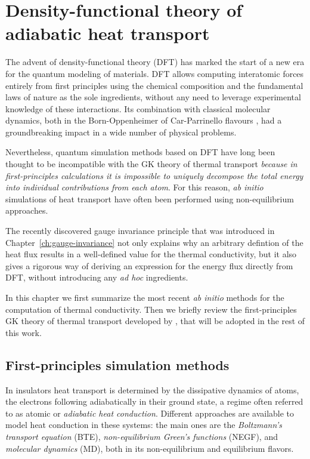 \chapter{Density-functional theory of adiabatic heat transport} \label{ch:dft-heat}

\begin{LEtext}
The advent of density-functional theory (DFT) \cite{Hohenberg1964,Kohn1965} has marked the start of a new era for the quantum modeling of materials. DFT allows computing interatomic forces entirely from first principles using the chemical composition and the fundamental laws of nature as the sole ingredients, without any need to leverage experimental knowledge of these interactions.
Its combination with classical molecular dynamics, both in the Born-Oppenheimer of Car-Parrinello flavours \cite{Car1985,Marx2009}, had a groundbreaking impact in a wide number of physical problems.

Nevertheless, quantum simulation methods based on DFT have long been thought to be incompatible with the GK theory of thermal transport \emph{because in first-principles calculations it is impossible to uniquely decompose the total energy into individual contributions from each atom}. \citep{Stackhouse2010b} For this reason, \emph{ab initio} simulations of heat transport have often been performed using non-equilibrium approaches.

The recently discovered gauge invariance principle that was introduced in Chapter~\ref{ch:gauge-invariance} not only explains why an arbitrary defintion of the heat flux results in a well-defined value for the thermal conductivity, but it also gives a rigorous way of deriving an expression for the energy flux directly from DFT, without introducing any \emph{ad hoc} ingredients.

In this chapter we first summarize the most recent \emph{ab initio} methods for the computation of thermal conductivity. Then we briefly review the first-principles GK theory of thermal transport developed by \citet{Marcolongo2014}, that will be adopted in the rest of this work.
\end{LEtext}


\section{First-principles simulation methods}

In insulators heat transport is determined by the dissipative dynamics of atoms, the electrons following adiabatically in their ground state, a regime often referred to as atomic or \emph{adiabatic heat conduction}. Different approaches are available to model heat conduction in these systems: the main ones are the \emph{Boltzmann's transport equation} (BTE), \emph{non-equilibrium Green's functions} (NEGF), and \emph{molecular dynamics} (MD), both in its non-equilibrium and equilibrium flavors. 


